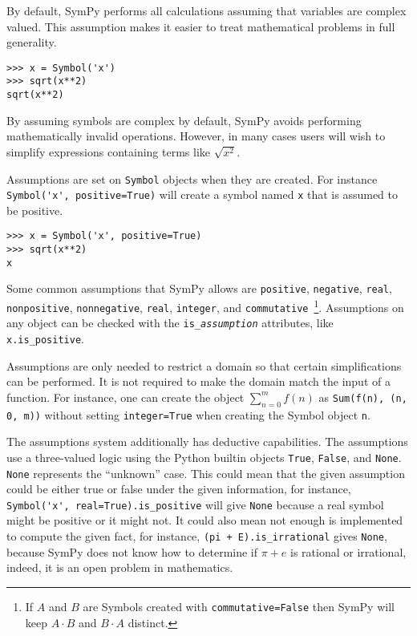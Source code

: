 By default, SymPy performs all calculations assuming that variables are
complex valued. This assumption makes it easier to treat mathematical problems
in full generality.

\begin{verbatim}
>>> x = Symbol('x')
>>> sqrt(x**2)
sqrt(x**2)
\end{verbatim}

By assuming symbols are complex by default, SymPy avoids performing
mathematically invalid operations. However, in many cases users will wish to
simplify expressions containing terms like $\sqrt{x^2}$.

Assumptions are set on \texttt{Symbol} objects when they are created. For
instance \verb|Symbol('x', positive=True)| will create a symbol named
\texttt{x} that is assumed to be positive.

\begin{verbatim}
>>> x = Symbol('x', positive=True)
>>> sqrt(x**2)
x
\end{verbatim}

Some common assumptions that SymPy allows are \texttt{positive},
\texttt{negative}, \texttt{real}, \texttt{nonpositive}, \texttt{nonnegative},
\texttt{real}, \texttt{integer}, and \texttt{commutative}~\footnote{If $A$ and
  $B$ are Symbols created with \texttt{commutative=False} then SymPy will keep
  $A\cdot B$ and $B\cdot A$ distinct.}. Assumptions on any object can be checked with the
\verb|is_|\texttt{\textit{assumption}} attributes, like \verb|x.is_positive|.

Assumptions are only needed to restrict a domain so that certain
simplifications can be performed. It is not required to make the domain match
the input of a function. For instance, one can create the object
$\sum_{n=0}^m f(n)$ as \verb|Sum(f(n), (n, 0, m))| without setting
\texttt{integer=True} when creating the Symbol object \texttt{n}.

The assumptions system additionally has deductive capabilities. The
assumptions use a three-valued logic using the Python builtin objects
\texttt{True}, \texttt{False}, and \texttt{None}. \texttt{None} represents the
``unknown'' case. This could mean that the given assumption could be either
true or false under the given information, for instance,
\verb|Symbol('x', real=True).is_positive| will give \texttt{None} because a real
symbol might be positive or it might not. It could also mean not enough is
implemented to compute the given fact, for instance,
\verb|(pi + E).is_irrational| gives \texttt{None}, because SymPy does not know
how to determine if $\pi + e$ is rational or irrational, indeed, it is an open
problem in mathematics. %


